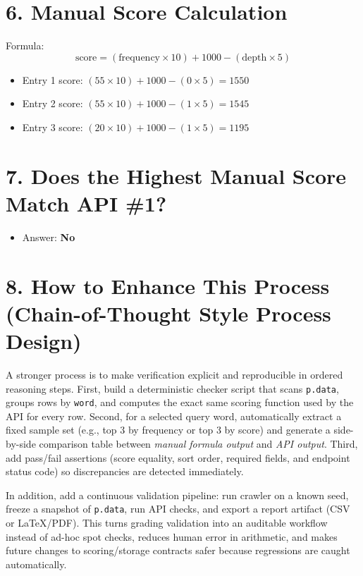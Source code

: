 \documentclass[11pt]{article}
\begin{document}
\section*{6. Manual Score Calculation}
Formula:
\[
\text{score} = (\text{frequency} \times 10) + 1000 - (\text{depth} \times 5)
\]

\begin{itemize}
  \item Entry 1 score: \((55 \times 10) + 1000 - (0 \times 5) = 1550\)
  \item Entry 2 score: \((55 \times 10) + 1000 - (1 \times 5) = 1545\)
  \item Entry 3 score: \((20 \times 10) + 1000 - (1 \times 5) = 1195\)
\end{itemize}

\section*{7. Does the Highest Manual Score Match API \#1?}
\begin{itemize}
  \item Answer: \textbf{No}
\end{itemize}

\section*{8. How to Enhance This Process (Chain-of-Thought Style Process Design)}
A stronger process is to make verification explicit and reproducible in ordered reasoning steps. First, build a deterministic checker script that scans \texttt{p.data}, groups rows by \texttt{word}, and computes the exact same scoring function used by the API for every row. Second, for a selected query word, automatically extract a fixed sample set (e.g., top 3 by frequency or top 3 by score) and generate a side-by-side comparison table between \emph{manual formula output} and \emph{API output}. Third, add pass/fail assertions (score equality, sort order, required fields, and endpoint status code) so discrepancies are detected immediately.

In addition, add a continuous validation pipeline: run crawler on a known seed, freeze a snapshot of \texttt{p.data}, run API checks, and export a report artifact (CSV or LaTeX/PDF). This turns grading validation into an auditable workflow instead of ad-hoc spot checks, reduces human error in arithmetic, and makes future changes to scoring/storage contracts safer because regressions are caught automatically.
\end{document}
